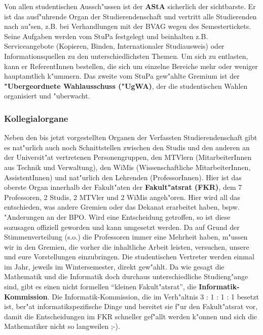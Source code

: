 
Von allen studentischen Aussch"ussen ist der \textbf{AStA} sicherlich der
sichtbarste. Er ist das ausf"uhrende Organ der 
Studierendenschaft und vertritt alle Studierenden nach au"sen, z.B. bei 
Verhandlungen mit der BVAG wegen des Semestertickets. Seine Aufgaben werden vom 
StuPa festgelegt und beinhalten z.B. Serviceangebote (Kopieren, Binden, 
Internationaler Studiausweis) oder Informationsquellen zu den 
unterschiedlichsten Themen. Um sich zu entlasten, kann er ReferentInnen 
bestellen, die sich um einzelne Bereiche mehr oder weniger hauptamtlich 
k"ummern. Das zweite vom StuPa gew"ahlte Gremium ist der \textbf{"Ubergeordnete 
Wahlausschuss ("UgWA)}, der die studentischen Wahlen organisiert und "uberwacht.

\subsubsection*{Kollegialorgane}

Neben den bis jetzt vorgestellten Organen der Verfassten Studierendenschaft 
gibt es nat"urlich auch noch Schnittstellen zwischen den Studis und den anderen 
an der Universit"at vertretenen Personengruppen, den MTVlern (MitarbeiterInnen 
aus Technik und Verwaltung), den WiMis (Wissenschaftliche MitarbeiterInnen, 
AssistentInnen) und nat"urlich den Lehrenden (ProfessorInnen). Hier ist das 
oberste Organ innerhalb der Fakult"aten der \textbf{Fakult"atsrat (FKR)}, 
dem 7 Professoren, 2 Studis, 2 MTVler und 2 WiMis angeh"oren. Hier wird all das 
entschieden, was andere Gremien oder das Dekanat erarbeitet haben, bspw. 
"Anderungen an der BPO. Wird eine Entscheidung getroffen, so ist diese 
sozusagen offiziell geworden und kann umgesetzt werden. Da auf Grund der 
Stimmenverteilung (s.o.) die Professoren immer eine Mehrheit haben, m"ussen wir 
in den Gremien, die vorher die inhaltliche Arbeit leisten, versuchen, unsere 
und eure Vorstellungen einzubringen. Die studentischen 
Vertreter werden einmal im Jahr, jeweils im Wintersemester, direkt gew"ahlt. Da 
wie gesagt die Mathematik und die Informatik doch durchaus unterschiedliche 
Studieng"ange sind, gibt es einen nicht formellen "`kleinen Fakult"atsrat"', 
die \textbf{Informatik-Kommission}. Die Informatik-Kommission, die im 
Verh"altnis 3 : 1 : 1 : 1 besetzt ist, ber"at informatikspezifische Dinge und 
bereitet sie f"ur den Fakult"atsrat vor, damit die Entscheidungen im FKR 
schneller gef"allt werden k"onnen und sich die Mathematiker nicht so langweilen 
;-).

